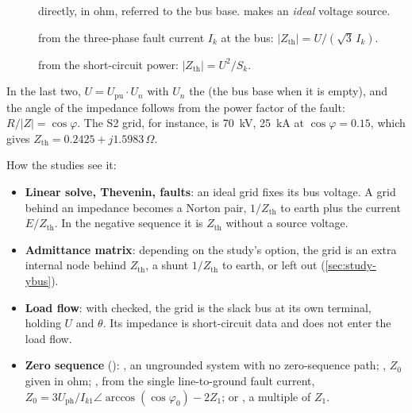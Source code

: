 \begin{description}
  \item[] directly, in ohm, referred to the bus base.  makes an
    \emph{ideal} voltage source.
  \item[] from the three-phase fault current $I_k$ at the bus:
    $|Z_\text{th}| = U / (\sqrt3\, I_k)$.
  \item[] from the short-circuit power: $|Z_\text{th}| = U^2 / S_k$.
\end{description}

In the last two, $U = U_\text{pu}\cdot U_n$ with $U_n$ the  (the bus base
when it is empty), and the angle of the impedance follows from the power factor of the
fault: $R/|Z| = \cos\varphi$. The S2 grid, for instance, is 70~kV, 25~kA at
$\cos\varphi = 0.15$, which gives $Z_\text{th} = 0.2425 + j1.5983\,\Omega$.

How the studies see it:

\begin{itemize}
  \item \textbf{Linear solve, Thevenin, faults}: an ideal grid fixes its bus voltage. A
    grid behind an impedance becomes a Norton pair, $1/Z_\text{th}$ to earth plus the
    current $E/Z_\text{th}$. In the negative sequence it is $Z_\text{th}$ without a
    source voltage.
  \item \textbf{Admittance matrix}: depending on the study's  option, the
    grid is an extra internal node behind $Z_\text{th}$, a shunt $1/Z_\text{th}$ to earth,
    or left out (\cref{sec:study-ybus}).
  \item \textbf{Load flow}: with  checked, the grid is the slack bus at its own
    terminal, holding $U$ and $\theta$. Its impedance is short-circuit data and does not
    enter the load flow.
  \item \textbf{Zero sequence} (): , an ungrounded system with no
    zero-sequence path; , $Z_0$ given in ohm; , from the single
    line-to-ground fault current, $Z_0 = 3U_\text{ph}/I_{k1}\angle\arccos(\cos\varphi_0) -
    2Z_1$; or , a multiple of $Z_1$.
\end{itemize}




